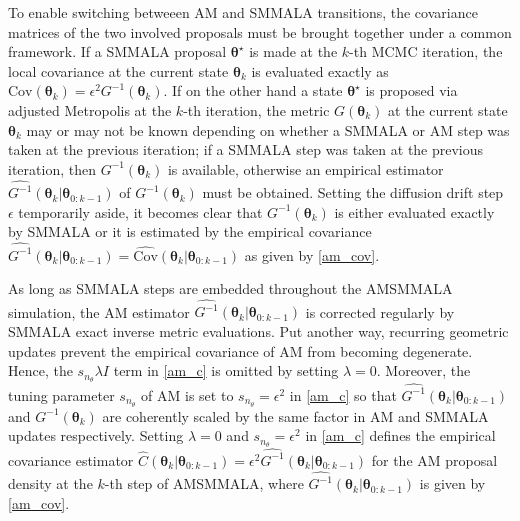 \documentclass[twoside,11pt]{article}
\begin{document}
To enable switching betweeen AM and SMMALA transitions, the covariance matrices of the two involved proposals must be brought
together under a common framework. If a SMMALA proposal $\boldsymbol{\theta}^{\star}$ is made at the $k$-th MCMC iteration, 
the local covariance at the current state $\boldsymbol{\theta}_k$ is evaluated exactly as
$\mbox{Cov}(\boldsymbol{\theta}_{k})=\epsilon^2 G^{-1}(\boldsymbol{\theta}_{k})$. If on the other hand a state 
$\boldsymbol{\theta}^{\star}$ is proposed via adjusted Metropolis at the $k$-th iteration, the metric 
$G(\boldsymbol{\theta}_{k})$ at the current state $\boldsymbol{\theta}_k$ may or may not be known depending on whether a
SMMALA or AM step was taken at the previous iteration; if a SMMALA step was taken at the previous iteration, then 
$G^{-1}(\boldsymbol{\theta}_{k})$ is available, otherwise an empirical estimator
$\widehat{G^{-1}}(\boldsymbol{\theta}_{k}|\boldsymbol{\theta}_{0:k-1})$ of $G^{-1}(\boldsymbol{\theta}_{k})$ must be 
obtained. Setting the diffusion drift step $\epsilon$ temporarily aside, it becomes clear that 
$G^{-1}(\boldsymbol{\theta}_{k})$ is either evaluated exactly by SMMALA or it is estimated by the empirical covariance
$
\widehat{G^{-1}}(\boldsymbol{\theta}_{k}|\boldsymbol{\theta}_{0:k-1})=
\widehat{\mbox{Cov}}(\boldsymbol{\theta}_{k}|\boldsymbol{\theta}_{0:k-1})
$
as given by \eqref{am_cov}.

As long as SMMALA steps are embedded throughout the AMSMMALA simulation, the AM estimator
$\widehat{G^{-1}}(\boldsymbol{\theta}_{k}|\boldsymbol{\theta}_{0:k-1})$ is corrected regularly by SMMALA exact inverse 
metric evaluations. Put another way, recurring geometric updates prevent the empirical covariance of
AM from becoming degenerate. Hence, the $s_{n_{\theta}}\lambda I$ term in \eqref{am_c} is omitted by setting $\lambda=0$.
Moreover, the tuning parameter $s_{n_{\theta}}$ of AM is set to $s_{n_{\theta}}=\epsilon^2$ in \eqref{am_c} so that
$\widehat{G^{-1}}(\boldsymbol{\theta}_{k}|\boldsymbol{\theta}_{0:k-1})$ and $G^{-1}(\boldsymbol{\theta}_k)$ are coherently
scaled by the same factor in AM and SMMALA updates respectively. Setting $\lambda=0$ and $s_{n_{\theta}}=\epsilon^2$ in
\eqref{am_c} defines the empirical covariance estimator
$\hat{C}(\boldsymbol{\theta}_{k}|\boldsymbol{\theta}_{0:k-1})=
\epsilon^2\widehat{G^{-1}}(\boldsymbol{\theta}_{k}|\boldsymbol{\theta}_{0:k-1})$
for the AM proposal density at the $k$-th step of AMSMMALA, where
$\widehat{G^{-1}}(\boldsymbol{\theta}_{k}|\boldsymbol{\theta}_{0:k-1})$ is given by \eqref{am_cov}.
\end{document}
